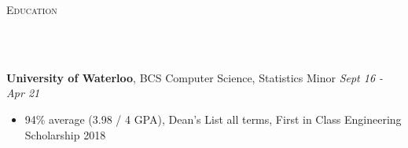 \documentclass[a4paper, 11pt, hidelinks]{article}
\newcommand{\lineunder} {
    \vspace*{-8pt} \\
    \hrulefill \\
}
\newcommand{\header} [1] {
    {\hspace*{-4pt}\vspace*{6pt} \textsc{#1}}
    \vspace*{-6pt}
    \lineunder
    \vspace{6pt}
}
\begin{document}
\header{Education}
\textbf{University of Waterloo}, BCS Computer Science, Statistics Minor \hfill\textit{Sept 16 - Apr 21}\\
\vspace{-2mm}
\begin{itemize}[leftmargin=2em] \itemsep 1pt
	\item 94\% average (3.98 / 4 GPA), Dean's List all terms, First in Class Engineering Scholarship 2018
\end{itemize}
\end{document}
